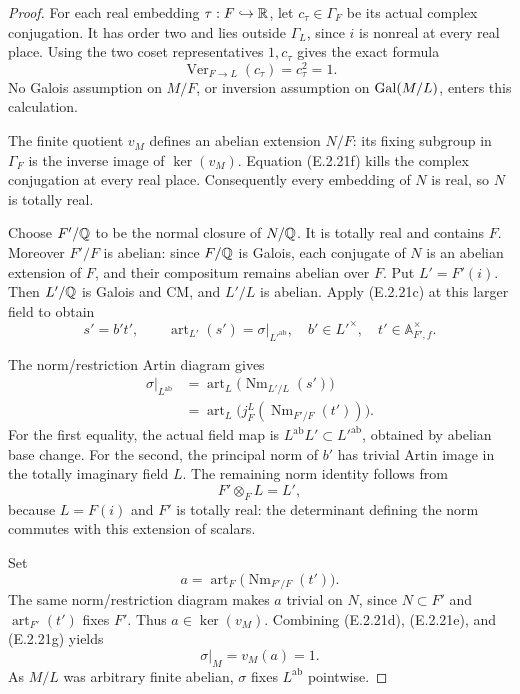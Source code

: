 \begin{proof}
For each real embedding \(\tau:F\hookrightarrow\mathbb R\),
let \(c_\tau\in\Gamma_F\) be its actual complex
conjugation. It has order two and lies outside
\(\Gamma_L\), since \(i\) is nonreal at every real
place. Using the two coset representatives
\(1,c_\tau\) gives the exact formula
\[
 \operatorname{Ver}_{F\to L}(c_\tau)=c_\tau^2=1.
 \tag{E.2.21f}
\]
No Galois assumption on \(M/F\), or inversion
assumption on \(\operatorname{Gal}(M/L)\), enters this calculation.

The finite quotient \(v_M\) defines an abelian
extension \(N/F\): its fixing subgroup in
\(\Gamma_F\) is the inverse image of
\(\ker(v_M)\). Equation (E.2.21f) kills the
complex conjugation at every real place.
Consequently every embedding of \(N\) is real,
so \(N\) is totally real.

Choose \(F'/\mathbb Q\) to be the normal closure of
\(N/\mathbb Q\). It is totally real and contains \(F\).
Moreover \(F'/F\) is abelian: since \(F/\mathbb Q\)
is Galois, each conjugate of \(N\) is an abelian
extension of \(F\), and their compositum remains
abelian over \(F\). Put \(L'=F'(i)\).
Then \(L'/\mathbb Q\) is Galois and CM, and \(L'/L\)
is abelian. Apply (E.2.21c) at this larger
field to obtain
\[
 s'=b't',\qquad
 \operatorname{art}_{L'}(s')
      =\sigma|_{L'^{\mathrm{ab}}},
 \quad b'\in L'^\times,\quad
 t'\in\mathbb A_{F',f}^{\times}.
\]

The norm/restriction Artin diagram gives
\[
 \begin{split}
 \sigma|_{L^{\mathrm{ab}}}
  &=\operatorname{art}_L
       \bigl(\operatorname{Nm}_{L'/L}(s')\bigr)\\
  &=\operatorname{art}_L
       \bigl(j_F^L(\operatorname{Nm}_{F'/F}(t'))\bigr).
 \end{split}
 \tag{E.2.21g}
\]
For the first equality, the actual field map is
\(L^{\mathrm{ab}}L'\subset L'^{\mathrm{ab}}\),
obtained by abelian base change.
For the second, the principal norm of \(b'\)
has trivial Artin image in the totally imaginary
field \(L\). The remaining norm identity follows
from
\[
 F'\otimes_F L=L',
\]
because \(L=F(i)\) and \(F'\) is totally real:
the determinant defining the norm commutes with
this extension of scalars.

Set
\[
 a=\operatorname{art}_F
       \bigl(\operatorname{Nm}_{F'/F}(t')\bigr).
\]
The same norm/restriction diagram makes \(a\)
trivial on \(N\), since \(N\subset F'\) and
\(\operatorname{art}_{F'}(t')\) fixes \(F'\).
Thus \(a\in\ker(v_M)\). Combining (E.2.21d),
(E.2.21e), and (E.2.21g) yields
\[
 \sigma|_M=v_M(a)=1.
\]
As \(M/L\) was arbitrary finite abelian, \(\sigma\)
fixes \(L^{\mathrm{ab}}\) pointwise.


\end{proof}
